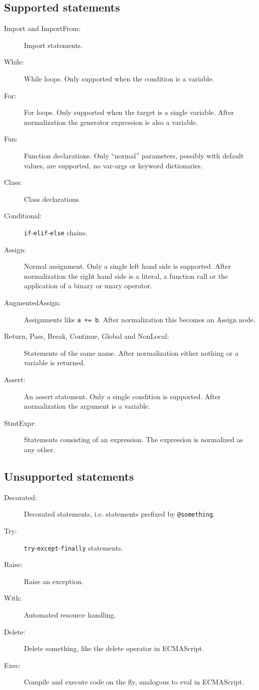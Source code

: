 \documentclass[11pt]{report}
\begin{document}
\begin{description}
\subsection{Supported statements}
\begin{description}
  \item[Import and ImportFrom:] Import statements.
  \item[While:] While loops. Only supported when the condition is a
    variable.
  \item[For:] For loops. Only supported when the target is a single
    variable. After normalization the generator expression is also a
    variable.
  \item[Fun:] Function declarations. Only ``normal'' parameters,
    possibly with default values, are supported, no var-args or
    keyword dictionaries.
  \item[Class:] Class declarations.
  \item[Conditional:] \verb|if|-\verb|elif|-\verb|else| chains.
  \item[Assign:] Normal assignment. Only a single left hand side is
    supported. After normalization the right hand side is a literal, a
    function call or the application of a binary or unary operator.
  \item[AugmentedAssign:] Assignments like \verb|a += b|. After
    normalization this becomes an Assign node.
  \item[Return, Pass, Break, Continue, Global and NonLocal:]
    Statements of the same name. After normalization either nothing or
    a variable is returned.
  \item[Assert:] An assert statement. Only a single condition is
    supported. After normalization the argument is a variable.
  \item[StmtExpr:] Statements consisting of an expression. The
    expression is normalized as any other.
\end{description}

\subsection{Unsupported statements}
\begin{description}
  \item[Decorated:] Decorated statements, i.e. statements prefixed by
    \verb|@something|.
  \item[Try:] \verb|try|-\verb|except|-\verb|finally| statements.
  \item[Raise:] Raise an exception.
  \item[With:] Automated resource handling.
  \item[Delete:] Delete something, like the delete operator in
    ECMAScript.
  \item[Exec:] Compile and execute code on the fly, analogous to eval
    in ECMAScript.
\end{description}


\end{description}
\end{document}
